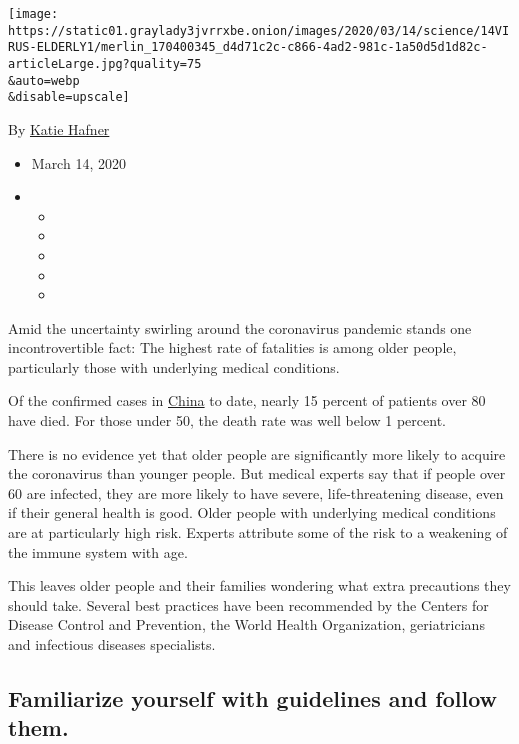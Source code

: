 \texttt{[image: https://static01.graylady3jvrrxbe.onion/images/2020/03/14/science/14VIRUS-ELDERLY1/merlin\_170400345\_d4d71c2c-c866-4ad2-981c-1a50d5d1d82c-articleLarge.jpg?quality=75\\\&auto=webp\\\&disable=upscale]}

By \href{https://www.nytimes3xbfgragh.onion/by/katie-hafner}{Katie
Hafner}

\begin{itemize}
\item
  March 14, 2020
\item
  \begin{itemize}
  \item
  \item
  \item
  \item
  \item
  \end{itemize}
\end{itemize}

Amid the uncertainty swirling around the coronavirus pandemic stands one
incontrovertible fact: The highest rate of fatalities is among older
people, particularly those with underlying medical conditions.

Of the confirmed cases in
\href{https://informationisbeautiful.net/visualizations/covid-19-coronavirus-infographic-datapack/}{China}
to date, nearly 15 percent of patients over 80 have died. For those
under 50, the death rate was well below 1 percent.

There is no evidence yet that older people are significantly more likely
to acquire the coronavirus than younger people. But medical experts say
that if people over 60 are infected, they are more likely to have
severe, life-threatening disease, even if their general health is good.
Older people with underlying medical conditions are at particularly high
risk. Experts attribute some of the risk to a weakening of the immune
system with age.

This leaves older people and their families wondering what extra
precautions they should take. Several best practices have been
recommended by the Centers for Disease Control and Prevention, the World
Health Organization, geriatricians and infectious diseases specialists.

\hypertarget{familiarize-yourself-with-guidelines-and-follow-them}{%
\subsection{Familiarize yourself with guidelines and follow
them.}\label{familiarize-yourself-with-guidelines-and-follow-them}}

